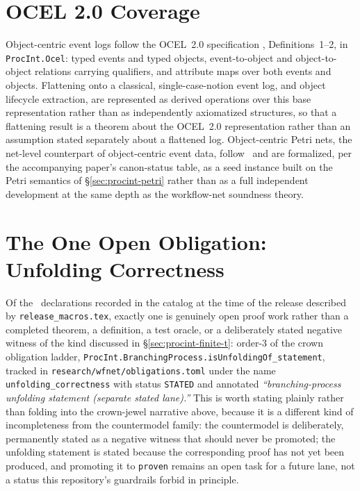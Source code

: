 \section{OCEL 2.0 Coverage}
\label{sec:procint-ocel}

Object-centric event logs follow the OCEL~2.0 specification
\cite{ocel2}, Definitions~1--2, in \texttt{ProcInt.Ocel}: typed events and
typed objects, event-to-object and object-to-object relations carrying
qualifiers, and attribute maps over both events and objects. Flattening
onto a classical, single-case-notion event log, and object lifecycle
extraction, are represented as derived operations over this base
representation rather than as independently axiomatized structures, so
that a flattening result is a theorem about the OCEL~2.0 representation
rather than an assumption stated separately about a flattened log.
Object-centric Petri nets, the net-level counterpart of object-centric
event data, follow~\cite{ocpn2020} and are formalized, per
the accompanying paper's canon-status table, as a seed instance built
on the Petri semantics of \S\ref{sec:procint-petri} rather than as a full
independent development at the same depth as the workflow-net soundness
theory.

\section{The One Open Obligation: Unfolding Correctness}
\label{sec:procint-open}

Of the \TotalDecls\ declarations recorded in the catalog at the time of
the release described by \texttt{release\_macros.tex},
exactly one is genuinely open proof
work rather than a completed theorem, a definition, a test oracle, or a
deliberately stated negative witness of the kind discussed in
\S\ref{sec:procint-finite-t}: order-3 of the crown obligation ladder,
\texttt{ProcInt.BranchingProcess.isUnfoldingOf\_statement}, tracked in
\texttt{research/wfnet/obligations.toml} under the name
\texttt{unfolding\_correctness} with status \texttt{STATED} and annotated
\emph{``branching-process unfolding statement (separate stated lane).''}
This is worth stating plainly rather than folding into the crown-jewel
narrative above, because it is a different kind of incompleteness from
the countermodel family: the countermodel is deliberately, permanently
stated as a negative witness that should never be promoted; the unfolding
statement is stated because the corresponding proof has not yet been
produced, and promoting it to \texttt{proven} remains an open task for a
future lane, not a status this repository's guardrails forbid in
principle.

